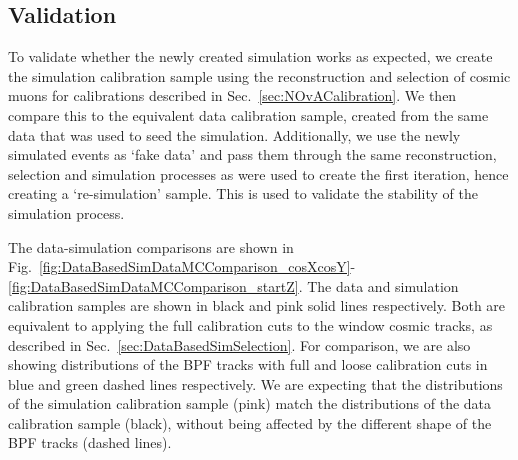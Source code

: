 \subsection{Validation}
To validate whether the newly created simulation works as expected, we create the simulation calibration sample using the reconstruction and selection of cosmic muons for calibrations described in Sec.~\ref{sec:NOvACalibration}. We then compare this to the equivalent data calibration sample, created from the same data that was used to seed the simulation. Additionally, we use the newly simulated events as `fake data' and pass them through the same reconstruction, selection and simulation processes as were used to create the first iteration, hence creating a `re-simulation' sample. This is used to validate the stability of the simulation process.

The data-simulation comparisons are shown in Fig.~\ref{fig:DataBasedSimDataMCComparison_cosXcosY}-\ref{fig:DataBasedSimDataMCComparison_startZ}. The data and simulation calibration samples are shown in black and pink solid lines respectively. Both are equivalent to applying the full calibration cuts to the window cosmic tracks, as described in Sec.~\ref{sec:DataBasedSimSelection}. For comparison, we are also showing distributions of the \gls{BPF} tracks with full and loose calibration cuts in blue and green dashed lines respectively. We are expecting that the distributions of the simulation calibration sample (pink) match the distributions of the data calibration sample (black), without being affected by the different shape of the \gls{BPF} tracks (dashed lines).

